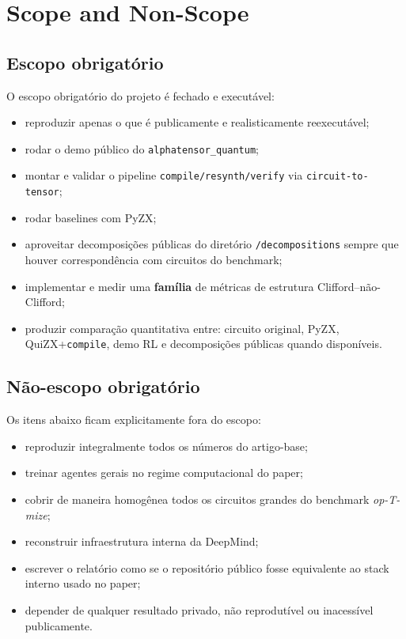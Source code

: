 \documentclass[a4paper,11pt]{article}
\begin{document}
\section{Scope and Non-Scope}

\subsection*{Escopo obrigatório}

O escopo obrigatório do projeto é fechado e executável:
\begin{itemize}
  \item reproduzir apenas o que é publicamente e realisticamente reexecutável;
  \item rodar o demo público do \texttt{alphatensor\_quantum};
  \item montar e validar o pipeline \texttt{compile/resynth/verify} via \texttt{circuit-to-tensor};
  \item rodar baselines com PyZX;
  \item aproveitar decomposições públicas do diretório \texttt{/decompositions} sempre que houver correspondência com circuitos do benchmark;
  \item implementar e medir uma \textbf{família} de métricas de estrutura Clifford--não-Clifford;
  \item produzir comparação quantitativa entre: circuito original, PyZX, QuiZX+\texttt{compile}, demo RL e decomposições públicas quando disponíveis.
\end{itemize}

\subsection*{Não-escopo obrigatório}

Os itens abaixo ficam explicitamente fora do escopo:
\begin{itemize}
  \item reproduzir integralmente todos os números do artigo-base;
  \item treinar agentes gerais no regime computacional do paper;
  \item cobrir de maneira homogênea todos os circuitos grandes do benchmark \textit{op-T-mize};
  \item reconstruir infraestrutura interna da DeepMind;
  \item escrever o relatório como se o repositório público fosse equivalente ao stack interno usado no paper;
  \item depender de qualquer resultado privado, não reprodutível ou inacessível publicamente.
\end{itemize}
\end{document}
